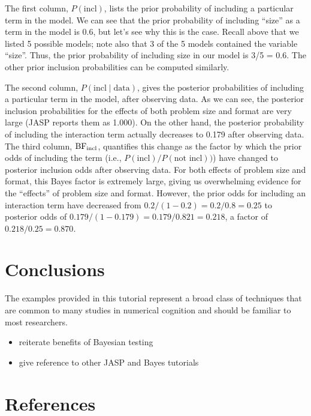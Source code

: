 \documentclass[english,,doc,floatsintext]{apa6}
\providecommand{\tightlist}{%
  \setlength{\itemsep}{0pt}\setlength{\parskip}{0pt}}
\begin{document}
The first column, \(P(\text{incl})\), lists the prior probability of including a particular term in the model. We can see that the prior probability of including ``size'' as a term in the model is 0.6, but let's see why this is the case. Recall above that we listed 5 possible models; note also that 3 of the 5 models contained the variable ``size''. Thus, the prior probability of including size in our model is 3/5 = 0.6. The other prior inclusion probabilities can be computed similarly.

The second column, \(P(\text{incl}\mid\text{data})\), gives the posterior probabilities of including a particular term in the model, after observing data. As we can see, the posterior inclusion probabilities for the effects of both problem size and format are very large (JASP reports them as 1.000). On the other hand, the posterior probability of including the interaction term actually decreases to 0.179 after observing data. The third column, \(\textnormal{BF}_{\text{incl}}\), quantifies this change as the factor by which the prior odds of including the term (i.e., \(P(\text{incl})/P(\text{not incl}))\)) have changed to posterior inclusion odds after observing data. For both effects of problem size and format, this Bayes factor is extremely large, giving us overwhelming evidence for the ``effects'' of problem size and format. However, the prior odds for including an interaction term have decreased from \(0.2/(1-0.2) = 0.2/0.8 = 0.25\) to posterior odds of \(0.179/(1-0.179) = 0.179/0.821 = 0.218\), a factor of \(0.218/0.25 = 0.870\).

\hypertarget{conclusions}{%
\section{Conclusions}\label{conclusions}}

The examples provided in this tutorial represent a broad class of techniques that are common to many studies in numerical cognition and should be familiar to most researchers.

\begin{itemize}
\tightlist
\item
  reiterate benefits of Bayesian testing
\item
  give reference to other JASP and Bayes tutorials
\end{itemize}

\newpage

\hypertarget{references}{%
\section{References}\label{references}}
\end{document}
